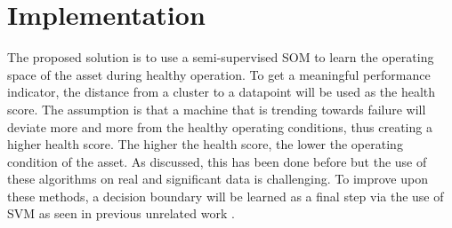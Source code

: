 \section{Implementation}

The proposed solution is to use a semi-supervised SOM to learn the operating space of the asset during healthy operation. 
To get a meaningful performance indicator, the distance from a cluster to a datapoint will be used as the health score.
The assumption is that a machine that is trending towards failure will deviate more and more from the healthy operating conditions, thus creating a higher health score.
The higher the health score, the lower the operating condition of the asset.
As discussed, this has been done before but the use of these algorithms on real and significant data is challenging.
To improve upon these methods, a decision boundary will be learned as a final step via the use of SVM as seen in previous unrelated work \cite{opt}.
